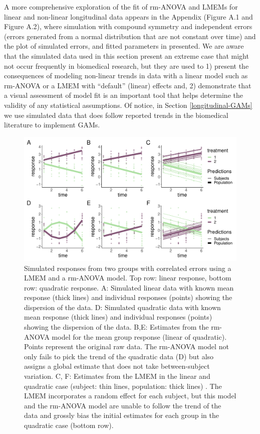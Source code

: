 \documentclass[
]{article}
\begin{document}
A more comprehensive exploration of the fit of rm-ANOVA and LMEMs for linear and non-linear longitudinal data appears in the Appendix (Figure A.1 and Figure A.2), where simulation with compound symmetry and independent errors (errors generated from a normal distribution that are not constant over time) and the plot of simulated errors, and fitted parameters in presented. We are aware that the simulated data used in this section present an extreme case that might not occur frequently in biomedical research, but they are used to 1) present the consequences of modeling non-linear trends in data with a linear model such as rm-ANOVA or a LMEM with ``default'' (linear) effects and, 2) demonstrate that a visual assessment of model fit is an important tool that helps determine the validity of any statistical assumptions. Of notice, in Section \ref{longitudinal-GAMs} we use simulated data that does follow reported trends in the biomedical literature to implement GAMs.



\begin{figure}

{\centering \includegraphics[width=1\linewidth]{Full_document_SIM_No_Appendix_files/figure-latex/l-q-response-1} 

}

\caption{Simulated responses from two groups with correlated errors using a LMEM and a rm-ANOVA model. Top row: linear response, bottom row: quadratic response. A: Simulated linear data with known mean response (thick lines) and individual responses (points) showing the dispersion of the data. D: Simulated quadratic data with known mean response (thick lines) and individual responses (points) showing the dispersion of the data. B,E: Estimates from the rm-ANOVA model for the mean group response (linear of quadratic). Points represent the original raw data. The rm-ANOVA model not only fails to pick the trend of the quadratic data (D) but also assigns a global estimate that does not take between-subject variation. C, F: Estimates from the LMEM in the linear and quadratic case (subject: thin lines, population: thick lines) . The LMEM incorporates a random effect for each subject, but this model and the rm-ANOVA model are unable to follow the trend of the data and grossly bias the initial estimates for each group in the quadratic case (bottom row).}\label{fig:l-q-response}
\end{figure}
\end{document}
